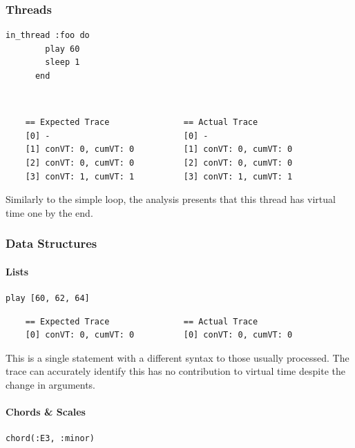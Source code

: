 \documentclass[11pt, abstracton, twoside, titlepage=true]{scrartcl}
\begin{document}
\subsubsection{Threads}
\begin{minipage}{\textwidth}
	\begin{lstlisting}[style = sonicpi]
      in_thread :foo do
        play 60
        sleep 1
      end
	\end{lstlisting}
\end{minipage}
\\
\begin{lstlisting}
    == Expected Trace               == Actual Trace
    [0] -                           [0] -
    [1] conVT: 0, cumVT: 0          [1] conVT: 0, cumVT: 0
    [2] conVT: 0, cumVT: 0          [2] conVT: 0, cumVT: 0
    [3] conVT: 1, cumVT: 1          [3] conVT: 1, cumVT: 1
\end{lstlisting}

Similarly to the simple loop, the analysis presents that this thread has virtual time
one by the end. 

\subsubsection{Data Structures}
\paragraph{Lists}
\begin{minipage}{\textwidth}
	\begin{lstlisting}[style = sonicpi]
      play [60, 62, 64]
	\end{lstlisting}
\end{minipage}

\begin{lstlisting}
    == Expected Trace               == Actual Trace
    [0] conVT: 0, cumVT: 0          [0] conVT: 0, cumVT: 0
\end{lstlisting}

This is a single statement with a different syntax to those usually processed. The 
trace can accurately identify this has no contribution to virtual time despite the 
change in arguments.

\paragraph{Chords \& Scales}
\begin{minipage}{\textwidth}
	\begin{lstlisting}[style = sonicpi]
      chord(:E3, :minor)
	\end{lstlisting}
\end{minipage}
\end{document}

